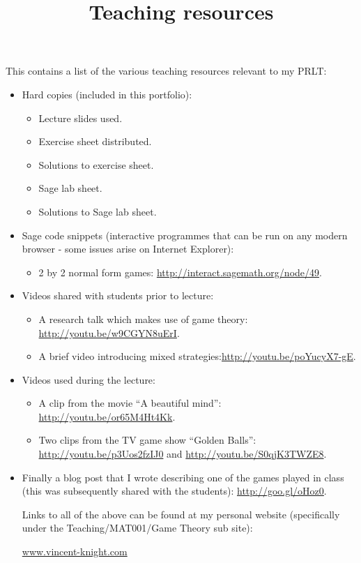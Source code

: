 \documentclass[12pt]{article}
\title{Teaching resources}
\date{}
\begin{document}
\maketitle

This contains a list of the various teaching resources relevant to my PRLT:

\begin{itemize}
\item Hard copies (included in this portfolio):
\begin{itemize}
    \item Lecture slides used.
    \item Exercise sheet distributed.
    \item Solutions to exercise sheet.
    \item Sage lab sheet.
    \item Solutions to Sage lab sheet.
\end{itemize}


\item Sage code snippets (interactive programmes that can be run on any modern browser - some issues arise on Internet Explorer):
\begin{itemize}
    \item 2 by 2 normal form games: \url{http://interact.sagemath.org/node/49}.
\end{itemize}

\item Videos shared with students prior to lecture:
\begin{itemize}
    \item A research talk which makes use of game theory: \url{http://youtu.be/w9CGYN8uErI}.
    \item A brief video introducing mixed strategies:\url{http://youtu.be/poYucyX7-gE}.
\end{itemize}

\item Videos used during the lecture:
\begin{itemize}
    \item A clip from the movie ``A beautiful mind'': \url{http://youtu.be/or65M4Ht4Kk}.
    \item Two clips from the TV game show ``Golden Balls'': \url{http://youtu.be/p3Uos2fzIJ0} and \url{http://youtu.be/S0qjK3TWZE8}.
\end{itemize}

\item Finally a blog post that I wrote describing one of the games played in class (this was subsequently shared with the students): \url{http://goo.gl/oHoz0}.

Links to all of the above can be found at my personal website (specifically under the Teaching/MAT001/Game Theory sub site):
\begin{center}
\url{www.vincent-knight.com}
\end{center}

\end{itemize}
\end{document}
